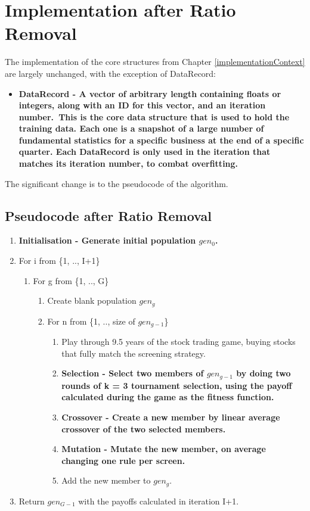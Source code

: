 \section{Implementation after Ratio Removal} \label{impRatioRem}
The implementation of the core structures from Chapter \ref{implementationContext} are largely unchanged, with the exception of DataRecord:
\begin{itemize}
    \item \bf DataRecord \rm - A vector of arbitrary length containing floats or integers, along with an ID for this vector, \bf and an iteration number.\rm \ This is the core data structure that is used to hold the training data. Each one is a snapshot of a large number of fundamental statistics for a specific business at the end of a specific quarter. \bf Each DataRecord is only used in the iteration that matches its iteration number, to combat overfitting.\rm
\end{itemize}

The significant change is to the pseudocode of the algorithm.

\subsection{Pseudocode after Ratio Removal}

\begin{enumerate}
    \item \bf Initialisation \rm - Generate initial population $gen_{0}$.
    \item For i from \{1, .., I+1\}
    \begin{enumerate}
        \item For g from \{1, .., G\}
        \begin{enumerate}
            \item Create blank population $gen_{g}$
            \item For n from \{1, .., size of $gen_{g-1}$\}
            \begin{enumerate}
                \item Play through 9.5 years of the stock trading game, buying stocks that fully match the screening strategy.
                \item \bf Selection \rm - Select two members of $gen_{g-1}$ by doing two rounds of k = 3 tournament selection, using the payoff calculated during the game as the fitness function.
                \item \bf Crossover \rm - Create a new member by linear average crossover of the two selected members.
                \item \bf Mutation \rm - Mutate the new member, on average changing one rule per screen.
                \item Add the new member to $gen_{g}$.
            \end{enumerate}
        \end{enumerate}
    \end{enumerate}
    \item Return $gen_{G-1}$ with the payoffs calculated in iteration I+1.
\end{enumerate}